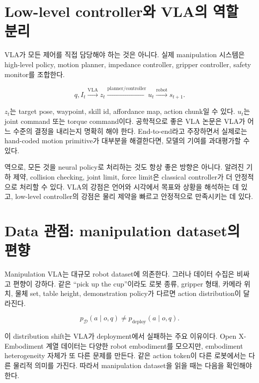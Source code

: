\section{Low-level controller와 VLA의 역할 분리}

VLA가 모든 제어를 직접 담당해야 하는 것은 아니다. 실제 manipulation 시스템은 high-level policy, motion planner, impedance controller, gripper controller, safety monitor를 조합한다.

\begin{equation}
  q, I_t
  \xrightarrow{\mathrm{VLA}}
  z_t
  \xrightarrow{\mathrm{planner/controller}}
  u_t
  \xrightarrow{\mathrm{robot}}
  s_{t+1}.
\end{equation}

$z_t$는 target pose, waypoint, skill id, affordance map, action chunk일 수 있다. $u_t$는 joint command 또는 torque command이다. 공학적으로 좋은 VLA 논문은 VLA가 어느 수준의 결정을 내리는지 명확히 해야 한다. End-to-end라고 주장하면서 실제로는 hand-coded motion primitive가 대부분을 해결한다면, 모델의 기여를 과대평가할 수 있다.

역으로, 모든 것을 neural policy로 처리하는 것도 항상 좋은 방향은 아니다. 알려진 기하 제약, collision checking, joint limit, force limit은 classical controller가 더 안정적으로 처리할 수 있다. VLA의 강점은 언어와 시각에서 목표와 상황을 해석하는 데 있고, low-level controller의 강점은 물리 제약을 빠르고 안정적으로 만족시키는 데 있다.

\section{Data 관점: manipulation dataset의 편향}

Manipulation VLA는 대규모 robot dataset에 의존한다. 그러나 데이터 수집은 비싸고 편향이 강하다. 같은 ``pick up the cup''이라도 로봇 종류, gripper 형태, 카메라 위치, 물체 set, table height, demonstration policy가 다르면 action distribution이 달라진다.

\begin{equation}
  p_{\mathcal{D}}(a \mid o,q)
  \ne
  p_{\mathrm{deploy}}(a \mid o,q).
\end{equation}

이 distribution shift는 VLA가 deployment에서 실패하는 주요 이유이다. Open X-Embodiment 계열 데이터는 다양한 robot embodiment를 모으지만, embodiment heterogeneity 자체가 또 다른 문제를 만든다. 같은 action token이 다른 로봇에서는 다른 물리적 의미를 가진다. 따라서 manipulation dataset을 읽을 때는 다음을 확인해야 한다.

